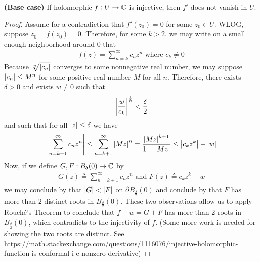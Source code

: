 \documentclass{report}
\begin{document}
\begin{theorem}
\textbf{(Base case)} If holomorphic $f: U \rightarrow \mathbb{C}$ is injective, then $f'$ does not vanish in  $U$.  
\end{theorem}
\begin{proof}
Assume for a contradiction that $f'(z_0)=0$ for some $z_0 \in U$. WLOG, suppose $z_0=f(z_0)=0$. Therefore, for some $k>2$, we may write on a small enough neighborhood around $0$ that 
 \begin{align*}
f(z)= \sum_{n=k}^{\infty} c_nz^n\text{ where }c_k \neq 0
\end{align*}
Because $\sqrt[n]{\left|c_n\right|}$ converges to some nonnegative real number, we may suppose $\left|c_n\right|\leq M^n$ for some positive real number $M$ for all $n$. Therefore, there exists $\delta> 0$ and exists $w\neq 0$ such that 
\begin{align} 
  \label{hy1}
  \left|\frac{w}{c_k}\right|^{\frac{1}{k}}< \frac{\delta}{2}
\end{align}
and such that for all $\left|z\right|\leq \delta$ we have 
 \begin{align}
\label{hy2}
 \left|\sum_{n=k+1}^{\infty} c_n z^n\right| \leq \sum_{n=k+1}^{\infty} \left|Mz\right|^n = \frac{\left|Mz\right|^{k+1}}{1- \left|Mz\right|} \leq \left|c_kz^k\right|-  \left|w\right| 
\end{align}
Now, if we define $G,F:B_\delta (0)\rightarrow \mathbb{C}$ by 
\begin{align*}
G(z)\triangleq \sum_{n=k+1}^{\infty}c_nz^n  \text{ and } F(z)\triangleq c_kz^k-w
\end{align*}
we may conclude by  that $\left|G\right|<\left|F\right|$ on $\partial B_{\frac{\delta}{2}}(0)$ and conclude by  that $F$ has more than $2$ distinct roots in  $B_{\frac{\delta}{2}}(0)$. These two observations allow us to apply Rouché's Theorem to conclude that $f-w=G+F$ has more than 2 roots in  $B_{\frac{\delta}{2}}(0)$, which contradicts to the injectivity of $f$. (Some more work is needed for showing the two roots are distinct. See https://math.stackexchange.com/questions/1116076/injective-holomorphic-function-is-conformal-i-e-nonzero-derivative)  
\end{proof}
\end{document}
